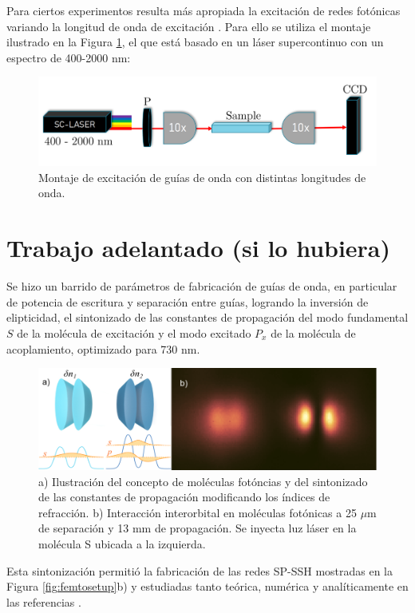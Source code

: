 \documentclass{article}
\begin{document}
Para ciertos experimentos resulta más apropiada la excitación de redes fotónicas variando la longitud de onda de excitación \cite{spectraltransfer, SPSSH}. Para ello se utiliza el montaje ilustrado en la Figura \ref{fig:supercontinuum}, el que está basado en un láser supercontinuo con un espectro de 400-2000 nm:

\begin{figure}[H]
	\centering
	\includegraphics[width=0.5\linewidth]{./media/supercontinuum.png}
	\caption{Montaje de excitación de guías de onda con distintas longitudes de onda.\label{fig:supercontinuum}}
\end{figure}


\section{Trabajo adelantado (si lo hubiera)}

Se hizo un barrido de parámetros de fabricación de guías de onda, en particular de potencia de escritura y separación entre guías, logrando la inversión de elipticidad, el sintonizado de las constantes de propagación del modo fundamental $S$ de la molécula de excitación y el modo excitado $P_x$ de la molécula de acoplamiento, optimizado para 730 nm.


\begin{figure}[H]
	\centering
	\includegraphics[width=0.7\linewidth]{./media/detuningv2.png}
	\caption{a) Ilustración del concepto de moléculas fotóncias y del sintonizado de las constantes de propagación modificando los índices de refracción. b) Interacción interorbital en moléculas fotónicas a 25 $\mu$m de separación y 13 mm de propagación. Se inyecta luz láser en la molécula S ubicada a la izquierda.}
\end{figure}

Esta sintonización permitió la fabricación de las redes SP-SSH mostradas en la Figura \ref{fig:femtosetup}b) y estudiadas tanto teórica, numérica y analíticamente en las referencias \cite{toporusos, topo1dphoto, SPSSH}.
\end{document}
